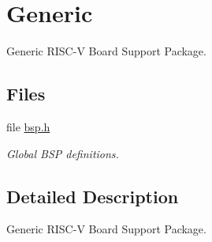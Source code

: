 \hypertarget{group__RTEMSBSPsRISCVGeneric}{}\section{Generic}
\label{group__RTEMSBSPsRISCVGeneric}


Generic R\+I\+S\+C-\/V Board Support Package.  


\subsection*{Files}
\begin{DoxyCompactItemize}
\item 
file \mbox{\hyperlink{bsps_2riscv_2riscv_2include_2bsp_8h}{bsp.\+h}}
\begin{DoxyCompactList}\small\item\em Global B\+SP definitions. \end{DoxyCompactList}\end{DoxyCompactItemize}


\subsection{Detailed Description}
Generic R\+I\+S\+C-\/V Board Support Package. 


